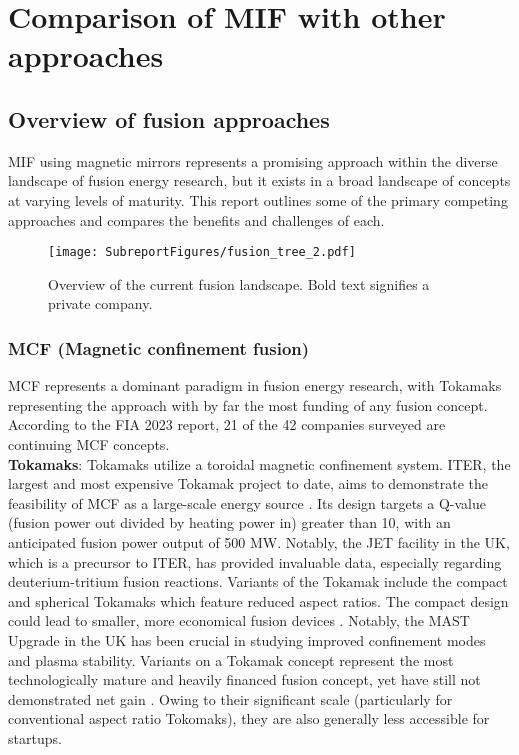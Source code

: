 \section{Comparison of MIF with other approaches}
\subsection{Overview of fusion approaches}

MIF using magnetic mirrors represents a promising approach within the diverse landscape of fusion energy research, but it exists in a broad landscape of concepts at varying levels of maturity. This report outlines some of the primary competing approaches and compares the benefits and challenges of each.

\begin{figure}[h!]
    \centering
    \texttt{[image: SubreportFigures/fusion\_tree\_2.pdf]}
    \caption{Overview of the current fusion landscape. Bold text signifies a private company.}
    \label{fig:climate_gdp}
\end{figure}

\subsubsection{MCF (Magnetic confinement fusion)}

MCF represents a dominant paradigm in fusion energy research, with Tokamaks representing the approach with by far the most funding of any fusion concept. According to the FIA 2023 report, 21 of the 42 companies surveyed are continuing MCF concepts.\\

\textbf{Tokamaks}: Tokamaks utilize a toroidal magnetic confinement system. ITER, the largest and most expensive Tokamak project to date, aims to demonstrate the feasibility of MCF as a large-scale energy source \cite{artsimovich1972tokamak}. Its design targets a Q-value (fusion power out divided by heating power in) greater than 10, with an anticipated fusion power output of 500 MW. Notably, the JET facility in the UK, which is a precursor to ITER, has provided invaluable data, especially regarding deuterium-tritium fusion reactions. Variants of the Tokamak include the compact and spherical Tokamaks which feature reduced aspect ratios. The compact design could lead to smaller, more economical fusion devices \cite{jarboe1994review}. Notably, the MAST Upgrade in the UK has been crucial in studying improved confinement modes and plasma stability. Variants on a Tokamak concept represent the most technologically mature and heavily financed fusion concept, yet have still not demonstrated net gain \cite{mirnov2018tokamak}. Owing to their significant scale (particularly for conventional aspect ratio Tokomaks), they are also generally less accessible for startups.\\

